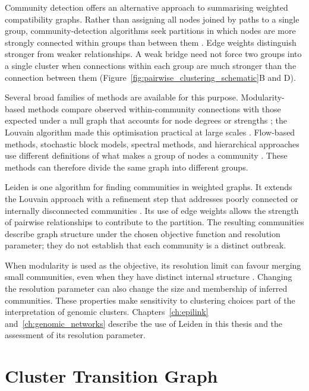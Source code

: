 Community detection offers an alternative approach to summarising weighted compatibility graphs. Rather than assigning all nodes joined by paths to a single group, community-detection algorithms seek partitions in which nodes are more strongly connected within groups than between them \citep{Liu2023,Fortunato2010,Newman2004}. Edge weights distinguish stronger from weaker relationships. A weak bridge need not force two groups into a single cluster when connections within each group are much stronger than the connection between them (Figure~\ref{fig:pairwise_clustering_schematic}B and D).

Several broad families of methods are available for this purpose. Modularity-based methods compare observed within-community connections with those expected under a null graph that accounts for node degrees or strengths \citep{Newman2004,Newman2006}; the Louvain algorithm made this optimisation practical at large scales \citep{Blondel2008}. Flow-based methods, stochastic block models, spectral methods, and hierarchical approaches use different definitions of what makes a group of nodes a community \citep{Rosvall2008,Holland1983,Fortunato2010}. These methods can therefore divide the same graph into different groups.

Leiden is one algorithm for finding communities in weighted graphs. It extends the Louvain approach with a refinement step that addresses poorly connected or internally disconnected communities \citep{Traag2019}. Its use of edge weights allows the strength of pairwise relationships to contribute to the partition. The resulting communities describe graph structure under the chosen objective function and resolution parameter; they do not establish that each community is a distinct outbreak.

When modularity is used as the objective, its resolution limit can favour merging small communities, even when they have distinct internal structure \citep{Fortunato2010}. Changing the resolution parameter can also change the size and membership of inferred communities. These properties make sensitivity to clustering choices part of the interpretation of genomic clusters. Chapters~\ref{ch:epilink} and~\ref{ch:genomic_networks} describe the use of Leiden in this thesis and the assessment of its resolution parameter.

\section{Cluster Transition Graph}\label{sec:ch2_transition_graph}

